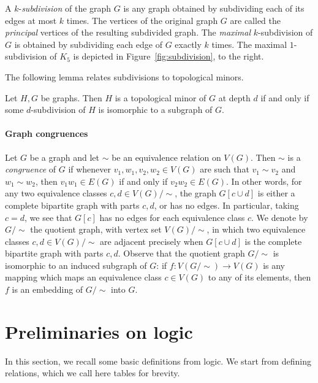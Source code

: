 A $k$-\emph{subdivision} of the graph $G$
is any graph obtained by subdividing each of its edges
at most $k$ times. The vertices of the original graph $G$
are called the \emph{principal} vertices of the resulting subdivided graph.
The \emph{maximal} $k$-subdivision of $G$ is obtained by subdividing each edge of $G$ exactly $k$ times. The maximal $1$-subdivision of $K_5$
is depicted in  Figure~\ref{fig:subdivision}, to the right.




The following lemma relates subdivisions to topological minors.
\begin{lemma}\label{lem:minors-subdivisions}
  Let $H,G$  be graphs. Then
  	$H$ is a topological minor of $G$ at depth $d$
  	if and only if some $d$-subdivision of $H$
  	is isomorphic to a subgraph of $G$.
\end{lemma}


\paragraph{Graph congruences}
Let $G$ be a graph and let $\sim$ be an equivalence relation on $V(G)$. Then $\sim$ is a \emph{congruence} of $G$ if 
whenever $v_1,w_1,v_2,w_2\in V(G)$ are such that 
 $v_1\sim v_2$ and $w_1\sim w_2$, then $v_1w_1\in E(G)$ if and only if $v_2w_2\in E(G)$. In other words,
  for any two equivalence classes $c,d\in V(G)/{\sim}$, the graph $G[c\cup d]$ is either a complete bipartite graph with parts $c,d$, or has no edges. In particular, taking  $c=d$, we see that $G[c]$ has no edges for each equivalence class $c$.
 We denote by $G/{\sim}$ the quotient graph,
 with vertex set $V(G)/{\sim}$, in which two equivalence classes $c,d\in V(G)/{\sim}$ are adjacent precisely when $G[c\cup d]$ is the complete bipartite graph with parts $c,d$. Observe that the quotient graph $G/{\sim}$ is isomorphic to an induced subgraph of $G$: if  $f:V(G/{\sim})\to V(G)$ is any mapping which maps an equivalence class $c\in V(G)$ to any of its elements, then $f$ is an embedding of $G/\sim$ into $G$.
 
 

\section{Preliminaries on logic}
In this section, we recall some basic definitions from logic. We start from defining relations, which we call here {tables} for brevity.



